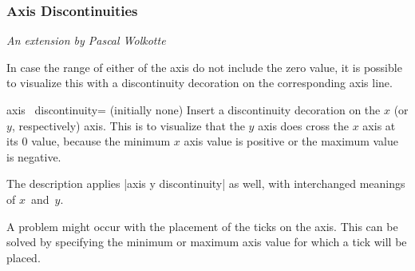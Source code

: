 \subsubsection{Axis Discontinuities}

{\small \emph{An extension by Pascal Wolkotte}}
\vspace{0.4cm}%

\noindent In case the range of either of the axis do not include the zero value, it is possible to visualize this with a discontinuity decoration on the corresponding axis line.

\begin{pgfplotsxykey}{axis \x\ discontinuity= (initially none)}
Insert a discontinuity decoration on the $x$ (or $y$, respectively) axis. 
This is to visualize that the $y$ axis does cross the $x$ axis at its $0$ value, because the minimum $x$ axis value is positive or the maximum value is negative.

The description applies |axis y discontinuity| as well, with interchanged meanings of $x$~and~$y$.

\begin{codeexample}[]
\end{codeexample}

\begin{codeexample}[]
\end{codeexample}
\end{pgfplotsxykey}

A problem might occur with the placement of the ticks on the axis.
This can be solved by specifying the minimum or maximum axis value for which a tick will be placed.

